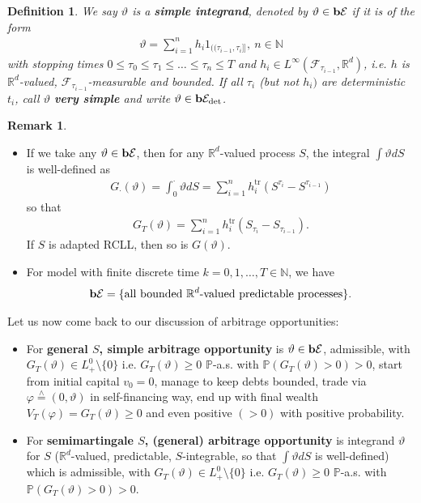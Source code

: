 \documentclass[12pt,a4paper, twoside]{article}
\newtheorem{defn}{Definition}[section]
\theoremstyle{definition}
\newtheorem{rem}{Remark}[section]
\newcommand{\PP}{\mathbb{P}} %
\newcommand{\teq}{\overset{\wedge}{=}}
\newcommand{\simple}{\textbf{\text{b}}\mathcal{E}}
\newcommand{\verysimple}{\textbf{\text{b}}\mathcal{E}_{\text{det}}}
\begin{document}
\begin{defn} We say $\vartheta$ is a \textbf{simple integrand}, denoted by $\vartheta \in \simple$ if it is of the form 
\begin{align*}
\vartheta = \sum_{i=1}^n h_i 1_{(\!( \tau_{i-1}, \tau_i ]\!]}, \ n \in \mathbb{N}
\end{align*}
with stopping times $0 \leq \tau_0 \leq \tau_1 \leq \dots \leq \tau_n \leq T$ and $h_i \in L^\infty ( \mathcal{F}_{\tau_{i-1}}, \mathbb{R}^d)$, i.e. $h$ is $\mathbb{R}^d$-valued, $ \mathcal{F}_{\tau_{i-1}}$-measurable and bounded. If all $\tau_i$ (but not $h_i)$ are deterministic $t_i$, call $\vartheta$ \textbf{very simple} and write $\vartheta \in \verysimple$. 
\end{defn}
\newpage
\begin{rem} \
\begin{itemize}
\item If we take any $\vartheta \in \simple$, then for any $\mathbb{R}^d$-valued process $S$, the integral $ \int \vartheta dS$ is well-defined as 
\begin{align*}
G_\cdot ( \vartheta) = \int_0^\cdot \vartheta dS = \sum_{i=1}^n h_i^{\text{tr}}(S^{\tau_i}- S^{\tau_{i-1}}) 
\end{align*}
so that 
\begin{align*}
G_T( \vartheta) = \sum_{i=1}^n h_i^{\text{tr}} (S_{\tau_i}-S_{\tau_{i-1}}).
\end{align*}
If $S$ is adapted RCLL, then so is $G( \vartheta)$. 
\item For model with finite discrete time $k=0,1, \dots , T \in \mathbb{N}$, we have
\begin{align*}
\simple = \{\text{all bounded $\mathbb{R}^d$-valued predictable processes}\}.
\end{align*}
\end{itemize}
\end{rem}
Let us now come back to our discussion of arbitrage opportunities:
\begin{itemize}
\item For \textbf{general $S$, simple arbitrage opportunity} is $\vartheta \in \simple$, admissible, with $G_T( \vartheta) \in L_+^0\setminus \{0 \}$ i.e. $G_T( \vartheta) \geq 0$ $\PP$-a.s. with $\PP( G_T( \vartheta) >0)>0$, start from initial capital $v_0=0$, manage to keep debts bounded, trade via $\varphi \teq (0, \vartheta)$ in self-financing way, end up with final wealth $V_T( \varphi) = G_T( \vartheta) \geq 0$ and even positive $(>0)$ with positive probability. 
\item For \textbf{semimartingale $S$, (general) arbitrage opportunity} is integrand $\vartheta$ for $S$ ($\mathbb{R}^d$-valued, predictable, $S$-integrable, so that $\int \vartheta dS$ is well-defined) which is admissible, with $G_T( \vartheta) \in L_+^0 \setminus \{0\}$ i.e. $G_T( \vartheta) \geq 0$ $\PP$-a.s. with $\PP( G_T( \vartheta) >0)>0$. 
\end{itemize}
\end{document}
